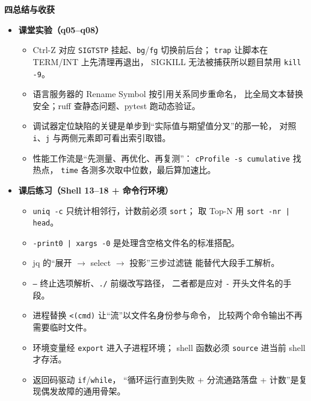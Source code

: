 \documentclass[11pt,a4paper,fontset=none]{ctexart}
\newcommand{\partbanner}[3]{%
  \par\vspace{1.6em}
  \begin{tcolorbox}[enhanced, colback=#1!10, colframe=#1!85!black,
    boxrule=1pt, arc=3pt, left=8pt, right=8pt, top=6pt, bottom=6pt,
    before skip=1.6em]
    {\Large\bfseries\color{#1!70!black}#2\qquad #3}
  \end{tcolorbox}
  \par\vspace{0.2em}\noindent\ignorespaces
}
\begin{document}
\partbanner{expone}{四}{总结与收获}
\begin{itemize}[leftmargin=1.4em, itemsep=2pt]
  \item \textbf{课堂实验（q05--q08）}
  \begin{itemize}[leftmargin=1.6em, itemsep=1pt]
    \item Ctrl-Z 对应 \texttt{SIGTSTP} 挂起、\texttt{bg}/\texttt{fg} 切换前后台；
          \texttt{trap} 让脚本在 TERM/INT 上先清理再退出，
          SIGKILL 无法被捕获所以题目禁用 \texttt{kill -9}。
    \item 语言服务器的 Rename Symbol 按引用关系同步重命名，
          比全局文本替换安全；ruff 查静态问题、pytest 跑动态验证。
    \item 调试器定位缺陷的关键是单步到“实际值与期望值分叉”的那一轮，
          对照 \texttt{i}、\texttt{j} 与两侧元素即可看出索引取错。
    \item 性能工作流是“先测量、再优化、再复测”：
          \texttt{cProfile -s cumulative} 找热点，
          \texttt{time} 各测多次取中位数，最后算加速比。
  \end{itemize}
  \item \textbf{课后练习（Shell 13--18 + 命令行环境）}
  \begin{itemize}[leftmargin=1.6em, itemsep=1pt]
    \item \texttt{uniq -c} 只统计相邻行，计数前必须 \texttt{sort}；
          取 Top-N 用 \texttt{sort -nr | head}。
    \item \texttt{-print0 | xargs -0} 是处理含空格文件名的标准搭配。
    \item jq 的“展开 $\rightarrow$ select $\rightarrow$ 投影”三步过滤链
          能替代大段手工解析。
    \item \texttt{--} 终止选项解析、\texttt{./} 前缀改写路径，
          二者都是应对 \texttt{-} 开头文件名的手段。
    \item 进程替换 \texttt{<(cmd)} 让“流”以文件名身份参与命令，
          比较两个命令输出不再需要临时文件。
    \item 环境变量经 \texttt{export} 进入子进程环境；
          shell 函数必须 \texttt{source} 进当前 shell 才存活。
    \item 返回码驱动 \texttt{if}/\texttt{while}，
          “循环运行直到失败 + 分流通路落盘 + 计数”是复现偶发故障的通用骨架。
  \end{itemize}
\end{itemize}
\end{document}
